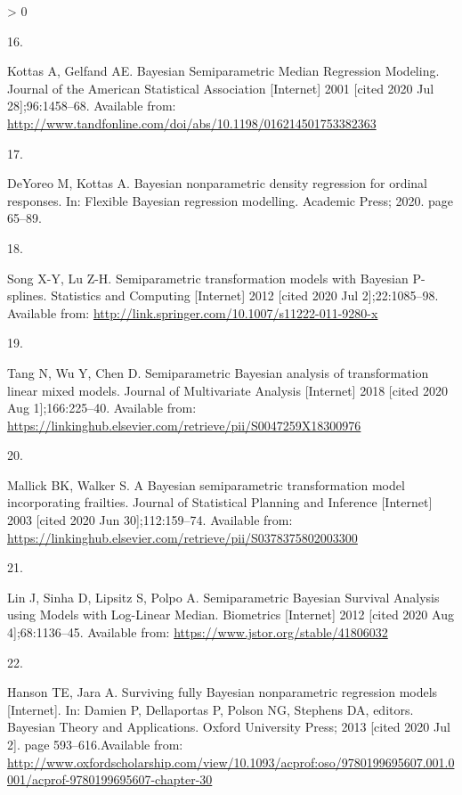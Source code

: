 \documentclass[
]{article}
\newlength{\cslhangindent}
\newlength{\csllabelwidth}
\newenvironment{CSLReferences}[2] %
 {%
  \setlength{\parindent}{0pt}
  \ifodd #1 \everypar{\setlength{\hangindent}{\cslhangindent}}\ignorespaces\fi
  \ifnum #2 > 0
  \setlength{\parskip}{#2\baselineskip}
  \fi
 }%
 {}
\newcommand{\CSLLeftMargin}[1]{\parbox[t]{\csllabelwidth}{#1}}
\newcommand{\CSLRightInline}[1]{\parbox[t]{\linewidth - \csllabelwidth}{#1}\break}
\begin{document}
\begin{CSLReferences}{0}{0}
\leavevmode\hypertarget{ref-kottas_bayesian_2001}{}%
\CSLLeftMargin{16. }
\CSLRightInline{Kottas A, Gelfand AE. Bayesian {Semiparametric} {Median} {Regression} {Modeling}. Journal of the American Statistical Association {[}Internet{]} 2001 {[}cited 2020 Jul 28{]};96:1458--68. Available from: \url{http://www.tandfonline.com/doi/abs/10.1198/016214501753382363}}

\leavevmode\hypertarget{ref-deyoreo_bayesian_2020}{}%
\CSLLeftMargin{17. }
\CSLRightInline{DeYoreo M, Kottas A. Bayesian nonparametric density regression for ordinal responses. In: Flexible {Bayesian} regression modelling. Academic Press; 2020. page 65--89.}

\leavevmode\hypertarget{ref-song_semiparametric_2012}{}%
\CSLLeftMargin{18. }
\CSLRightInline{Song X-Y, Lu Z-H. Semiparametric transformation models with {Bayesian} {P}-splines. Statistics and Computing {[}Internet{]} 2012 {[}cited 2020 Jul 2{]};22:1085--98. Available from: \url{http://link.springer.com/10.1007/s11222-011-9280-x}}

\leavevmode\hypertarget{ref-tang_semiparametric_2018}{}%
\CSLLeftMargin{19. }
\CSLRightInline{Tang N, Wu Y, Chen D. Semiparametric {Bayesian} analysis of transformation linear mixed models. Journal of Multivariate Analysis {[}Internet{]} 2018 {[}cited 2020 Aug 1{]};166:225--40. Available from: \url{https://linkinghub.elsevier.com/retrieve/pii/S0047259X18300976}}

\leavevmode\hypertarget{ref-mallick_bayesian_2003}{}%
\CSLLeftMargin{20. }
\CSLRightInline{Mallick BK, Walker S. A {Bayesian} semiparametric transformation model incorporating frailties. Journal of Statistical Planning and Inference {[}Internet{]} 2003 {[}cited 2020 Jun 30{]};112:159--74. Available from: \url{https://linkinghub.elsevier.com/retrieve/pii/S0378375802003300}}

\leavevmode\hypertarget{ref-lin_semiparametric_2012}{}%
\CSLLeftMargin{21. }
\CSLRightInline{Lin J, Sinha D, Lipsitz S, Polpo A. Semiparametric {Bayesian} {Survival} {Analysis} using {Models} with {Log}-{Linear} {Median}. Biometrics {[}Internet{]} 2012 {[}cited 2020 Aug 4{]};68:1136--45. Available from: \url{https://www.jstor.org/stable/41806032}}

\leavevmode\hypertarget{ref-damien_surviving_2013}{}%
\CSLLeftMargin{22. }
\CSLRightInline{Hanson TE, Jara A. Surviving fully {Bayesian} nonparametric regression models {[}Internet{]}. In: Damien P, Dellaportas P, Polson NG, Stephens DA, editors. Bayesian {Theory} and {Applications}. Oxford University Press; 2013 {[}cited 2020 Jul 2{]}. page 593--616.Available from: \url{http://www.oxfordscholarship.com/view/10.1093/acprof:oso/9780199695607.001.0001/acprof-9780199695607-chapter-30}}


\end{CSLReferences}
\end{document}
